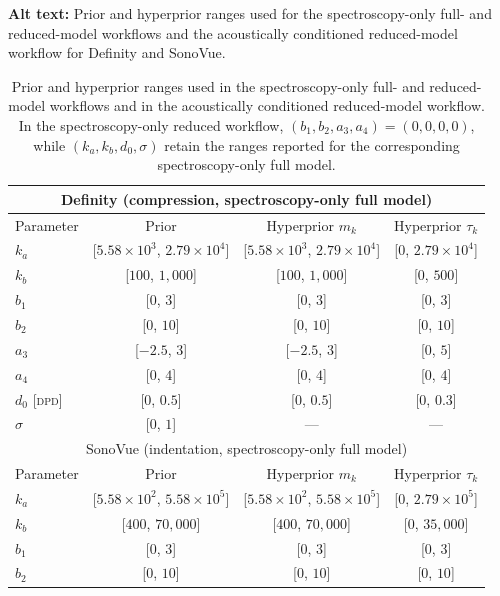 \documentclass[%
 aip,
 jcp,
 amsmath,amssymb,
 preprint,%
]{revtex4-1}
\begin{document}
\begin{table}[!htbp]
\caption{\label{tab:priors}
Prior and hyperprior ranges used in the spectroscopy-only full- and reduced-model workflows and in the acoustically conditioned reduced-model workflow. In the spectroscopy-only reduced workflow, $(b_1,b_2,a_3,a_4)=(0,0,0,0)$, while $(k_a,k_b,d_0,\sigma)$ retain the ranges reported for the corresponding spectroscopy-only full model.}
\noindent\textbf{Alt text:} Prior and hyperprior ranges used for the spectroscopy-only full- and reduced-model workflows and the acoustically conditioned reduced-model workflow for Definity and SonoVue.
\par\vspace{0.75\baselineskip}
\begin{ruledtabular}
\scriptsize
\begin{tabular}{lccc}
\multicolumn{4}{c}{Definity (compression, spectroscopy-only full model)} \\
\hline
Parameter & Prior & Hyperprior $m_k$ & Hyperprior $\tau_k$ \\
\hline
$k_a$ & [$5.58{\times}10^3$, $2.79{\times}10^4$] & [$5.58{\times}10^3$, $2.79{\times}10^4$] & [$0$, $2.79{\times}10^4$] \\
$k_b$ & [$100$, $1,000$] & [$100$, $1,000$] & [$0$, $500$] \\
$b_1$ & [$0$, $3$] & [$0$, $3$] & [$0$, $3$] \\
$b_2$ & [$0$, $10$] & [$0$, $10$] & [$0$, $10$] \\
$a_3$ & [$-2.5$, $3$] & [$-2.5$, $3$] & [$0$, $5$] \\
$a_4$ & [$0$, $4$] & [$0$, $4$] & [$0$, $4$] \\
$d_0$ [\textsc{dpd}] & [$0$, $0.5$] & [$0$, $0.5$] & [$0$, $0.3$] \\
$\sigma$ & [$0$, $1$] & --- & --- \\
\hline
\multicolumn{4}{c}{SonoVue (indentation, spectroscopy-only full model)} \\
\hline
Parameter & Prior & Hyperprior $m_k$ & Hyperprior $\tau_k$ \\
\hline
$k_a$ & [$5.58{\times}10^2$, $5.58{\times}10^5$] & [$5.58{\times}10^2$, $5.58{\times}10^5$] & [$0$, $2.79{\times}10^5$] \\
$k_b$ & [$400$, $70,000$] & [$400$, $70,000$] & [$0$, $35,000$] \\
$b_1$ & [$0$, $3$] & [$0$, $3$] & [$0$, $3$] \\
$b_2$ & [$0$, $10$] & [$0$, $10$] & [$0$, $10$] \\

\end{tabular}
\end{ruledtabular}
\end{table}
\end{document}
